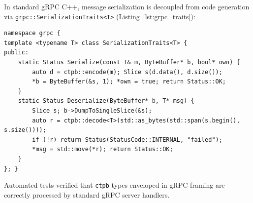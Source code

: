 In standard gRPC C++, message serialization is decoupled from code generation via \texttt{grpc::SerializationTraits<T>} (Listing~\ref{lst:grpc_traits}):
\noindent\begin{minipage}{\columnwidth}
\begin{lstlisting}[language=ModernC++, basicstyle=\fontsize{6.2pt}{6.9pt}\ttfamily, label={lst:grpc_traits}, caption={gRPC Serialization Traits for \texttt{ctpb} Types}]
namespace grpc {
template <typename T> class SerializationTraits<T> {
public:
    static Status Serialize(const T& m, ByteBuffer* b, bool* own) {
        auto d = ctpb::encode(m); Slice s(d.data(), d.size());
        *b = ByteBuffer(&s, 1); *own = true; return Status::OK;
    }
    static Status Deserialize(ByteBuffer* b, T* msg) {
        Slice s; b->DumpToSingleSlice(&s);
        auto r = ctpb::decode<T>(std::as_bytes(std::span(s.begin(), s.size())));
        if (!r) return Status(StatusCode::INTERNAL, "failed");
        *msg = std::move(*r); return Status::OK;
    }
}; }
\end{lstlisting}
\end{minipage}

Automated tests verified that \texttt{ctpb} types enveloped in gRPC framing are correctly processed by standard gRPC server handlers.

